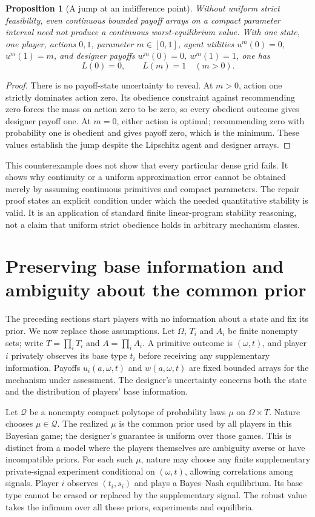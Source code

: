 \documentclass[11pt]{article}
\newtheorem{proposition}[theorem]{Proposition}
\theoremstyle{definition}
\theoremstyle{remark}
\begin{document}
\begin{proposition}[A jump at an indifference point]
Without uniform strict feasibility, even continuous bounded payoff
arrays on a compact parameter interval need not produce a continuous
worst-equilibrium value. With one state, one player, actions $0,1$,
parameter $m\in[0,1]$, agent utilities $u^m(0)=0$, $u^m(1)=m$,
and designer payoffs $w^m(0)=0$, $w^m(1)=1$, one has
\[
 L(0)=0,\qquad L(m)=1\quad(m>0).
\]
\end{proposition}
\begin{proof}
There is no payoff-state uncertainty to reveal. At $m>0$, action one
strictly dominates action zero. Its obedience constraint against
recommending zero forces the mass on action zero to be zero, so every
obedient outcome gives designer payoff one. At $m=0$, either action
is optimal; recommending zero with probability one is obedient and
gives payoff zero, which is the minimum. These values establish the
jump despite the Lipschitz agent and designer arrays.
\end{proof}
This counterexample does not show that every particular dense grid
fails. It shows why continuity or a uniform approximation error cannot
be obtained merely by assuming continuous primitives and compact
parameters. The repair proof states an explicit condition under which
the needed quantitative stability is valid. It is an application of
standard finite linear-program stability reasoning, not a claim that
uniform strict obedience holds in arbitrary mechanism classes.


\section{Preserving base information and ambiguity about the common prior}
The preceding sections start players with no information about a state
and fix its prior. We now replace those assumptions. Let $\Omega$,
$T_i$ and $A_i$ be finite nonempty sets; write
$T=\prod_iT_i$ and $A=\prod_iA_i$. A primitive outcome is
$(\omega,t)$, and player $i$ privately observes its base type $t_i$
before receiving any supplementary information. Payoffs
$u_i(a,\omega,t)$ and $w(a,\omega,t)$ are fixed bounded arrays for
the mechanism under assessment. The designer's uncertainty concerns
both the state and the distribution of players' base information.

Let $\mathcal Q$ be a nonempty compact polytope of probability laws
$\mu$ on $\Omega\times T$. Nature chooses $\mu\in\mathcal Q$.
The realized $\mu$ is the common prior used by all players in this
Bayesian game; the designer's guarantee is uniform over those games.
This is distinct from a model where the players themselves are
ambiguity averse or have incompatible priors. For each such $\mu$,
nature may choose any finite supplementary private-signal experiment
conditional on $(\omega,t)$, allowing correlations among signals.
Player $i$ observes $(t_i,s_i)$ and plays a Bayes--Nash equilibrium.
Its base type cannot be erased or replaced by the supplementary signal.
The robust value takes the infimum over all these priors, experiments
and equilibria.
\end{document}
